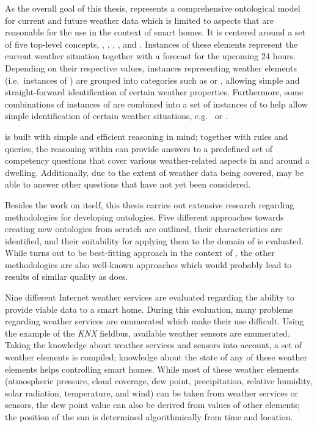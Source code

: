 \vspace{1em}

As the overall goal of this thesis, \smarthomeweather represents a comprehensive ontological model for current and future weather data which is limited to aspects that are reasonable for the use in the context of smart homes. It is centered around a set of five top-level concepts, , , , , and . Instances of these elements represent the current weather situation together with a forecast for the upcoming 24 hours. Depending on their respective values, instances representing weather elements (i.e.\ instances of ) are grouped into categories such as  or , allowing simple and straight-forward identification of certain weather properties. Furthermore, some combinations of instances of  are combined into a set of instances of  to help allow simple identification of certain weather situations, e.g.\  or .

\smarthomeweather is built with simple and efficient  reasoning in mind; together with  rules and  queries, the reasoning within \smarthomeweather can provide answers to a predefined set of competency questions that cover various weather-related aspects in and around a dwelling. Additionally, due to the extent of weather data being covered, \smarthomeweather may be able to answer other questions that have not yet been considered.

Besides the work on \smarthomeweather itself, this thesis carries out extensive research regarding methodologies for developing ontologies. Five different approaches towards creating new ontologies from scratch are outlined, their characteristics are identified, and their suitability for applying them to the domain of \smarthomeweather is evaluated. While \methontology turns out to be best-fitting approach in the context of \smarthomeweather, the other methodologies are also well-known approaches which would probably lead to results of similar quality as \methontology does.

Nine different Internet weather services are evaluated regarding the ability to provide viable data to a smart home. During this evaluation, many problems regarding weather services are enumerated which make their use difficult.  Using the example of the \emph{KNX} fieldbus, available weather sensors are enumerated. Taking the knowledge about weather services and sensors into account, a set of weather elements is compiled; knowledge about the state of any of these weather elements helps controlling smart homes. While most of these weather elements (atmospheric pressure, cloud coverage, dew point, precipitation, relative humidity, solar radiation, temperature, and wind) can be taken from weather services or sensors, the dew point value can also be derived from values of other elements; the position of the sun is determined algorithmically from time and location.

